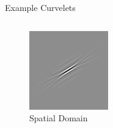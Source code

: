 \documentclass[mathserif]{beamer}
\begin{document}
\begin{frame}{Example Curvelets}
\begin{columns}
\begin{column}{.5\textwidth}
\begin{figure}
                \includegraphics[width=.5\textwidth]{illustrations/curvelet_examples/curvelet_2_time}
                \caption{Spatial Domain}
            \end{figure}
        \end{column}
    \end{columns}
\end{frame}
\end{document}
